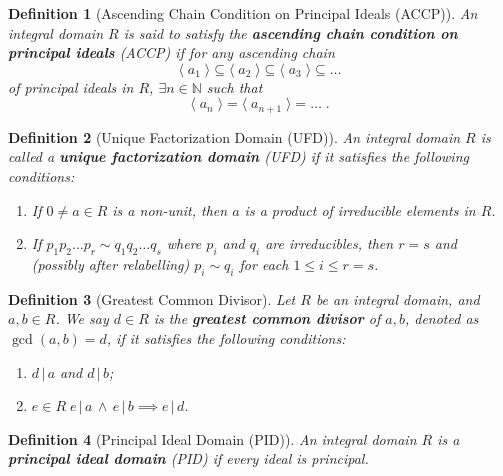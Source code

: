 \documentclass[9pt,landscape,a4paper]{article}
\newcommand{\lra}[1]{\langle \; #1 \; \rangle}
\newcommand{\hlnoteb}[1]{\textcolor{base16-eighties-magenta}{\textbf{#1}}}
\theoremstyle{empty}
\newtheorem{defn}{Definition}
\begin{document}
\begin{multicols*}{5}
\begin{defn}[Ascending Chain Condition on Principal Ideals (ACCP)]
\label{defn:ascending_chain_condition_on_principal_ideals}
An integral domain $R$ is said to satisfy the \hlnoteb{ascending chain condition on principal ideals} (ACCP) if for any ascending chain
\begin{equation*}
  \lra{a_1} \subseteq \lra{a_2} \subseteq \lra{a_3} \subseteq \hdots
\end{equation*}
of principal ideals in $R$, $\exists n \in \mathbb{N}$ such that
\begin{equation*}
  \lra{a_n} = \lra{a_{n + 1}} = \hdots \; .
\end{equation*}
\end{defn}

\begin{defn}[Unique Factorization Domain (UFD)]
\label{defn:unique_factorization_domain}
  An integral domain $R$ is called a \hlnoteb{unique factorization domain} (UFD) if it satisfies the following conditions:
  \begin{enumerate}
    \item If $0 \neq a \in R$ is a non-unit, then $a$ is a product of irreducible elements in $R$.
    \item If $p_1 p_2 \hdots p_r \sim q_1 q_2 \hdots q_s$ where $p_i$ and $q_i$ are irreducibles, then $r = s$ and (possibly after relabelling) $p_i \sim q_i$ for each $1 \leq i \leq r = s$.
  \end{enumerate}
\end{defn}

\begin{defn}[Greatest Common Divisor]
\label{defn:greatest_common_divisor}
  Let $R$ be an integral domain, and $a, b \in R$. We say $d \in R$ is the \hlnoteb{greatest common divisor} of $a, b$, denoted as $\gcd(a, b) = d$, if it satisfies the following conditions:
  \begin{enumerate}
    \item $d \, | \, a$ and $d \, | \, b$;
    \item $e \in R \; e \, | \, a \, \land \, e \, | \, b \implies e \, | \, d$.
  \end{enumerate}
\end{defn}

\begin{defn}[Principal Ideal Domain (PID)]
\label{defn:principal_ideal_domain}
  An integral domain $R$ is a \hlnoteb{principal ideal domain} (PID) if every ideal is principal.
\end{defn}


\end{multicols*}
\end{document}
